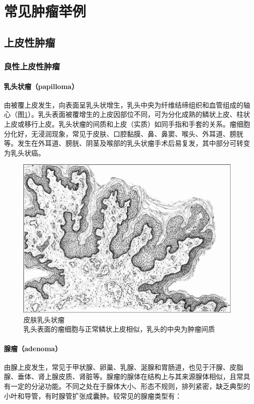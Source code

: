 \section{常见肿瘤举例}

\subsection{上皮性肿瘤}

\subsubsection{良性上皮性肿瘤}

\paragraph{乳头状瘤（papilloma）}
由被覆上皮发生，向表面呈乳头状增生，乳头中央为纤维结缔组织和血管组成的轴心（图\ref{fig5-13}）。乳头表面被覆增生的上皮因部位不同，可为分化成熟的鳞状上皮、柱状上皮或移行上皮。乳头状瘤的间质和上皮（实质）如同手指和手套的关系。瘤细胞分化好，无浸润现象，常见于皮肤、口腔黏膜、鼻、鼻窦、喉头、外耳道、膀胱等。发生在外耳道、膀胱、阴茎及喉部的乳头状瘤手术后易复发，其中部分可转变为乳头状癌。

\begin{figure}[!htbp]
  \centering
  \includegraphics{./images/Image00081.jpg}
  \caption{皮肤乳头状瘤\\{\small 乳头表面的瘤细胞与正常鳞状上皮相似，乳头的中央为肿瘤间质}}
  \label{fig5-13}
\end{figure}



\paragraph{腺瘤（adenoma）}
由腺上皮发生，常见于甲状腺、卵巢、乳腺、涎腺和胃肠道，也见于汗腺、皮脂腺、垂体、肾上腺皮质、肾脏等。腺瘤的腺体在结构上与其来源腺体相似，且常具有一定的分泌功能。不同之处在于腺体大小、形态不规则，排列紧密，缺乏典型的小叶和导管，有时腺管扩张成囊肿。较常见的腺瘤类型有：

